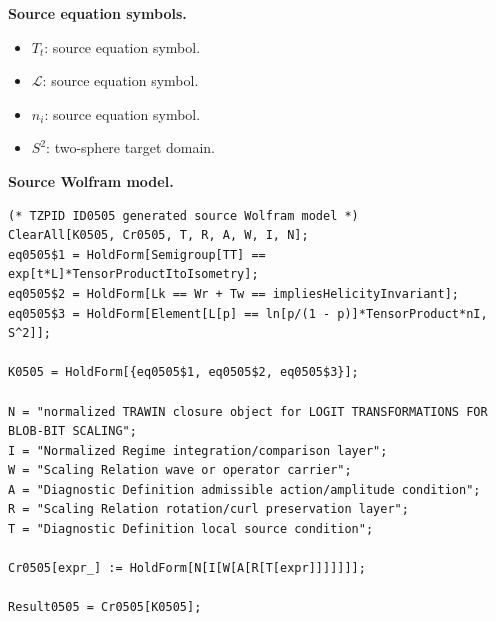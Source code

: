 \begin{minipage}[t]{0.49\linewidth}
\begingroup
\small
\raggedright
\textbf{Source equation symbols.}\par
\begin{itemize}[leftmargin=1.35em,itemsep=1pt,topsep=1pt,parsep=0pt]
    \item $T_t$: source equation symbol.
    \item $\mathcal{L}$: source equation symbol.
    \item $n_i$: source equation symbol.
    \item $S^2$: two-sphere target domain.
\end{itemize}
\endgroup
\end{minipage}\hfill
\begin{minipage}[t]{0.47\linewidth}
\begingroup
\scriptsize
\raggedright
\textbf{Source Wolfram model.}\par
\begin{Verbatim}[fontsize=\tiny,breaklines=true,breakanywhere=true]
(* TZPID ID0505 generated source Wolfram model *)
ClearAll[K0505, Cr0505, T, R, A, W, I, N];
eq0505$1 = HoldForm[Semigroup[TT] == exp[t*L]*TensorProductItoIsometry];
eq0505$2 = HoldForm[Lk == Wr + Tw == impliesHelicityInvariant];
eq0505$3 = HoldForm[Element[L[p] == ln[p/(1 - p)]*TensorProduct*nI, S^2]];

K0505 = HoldForm[{eq0505$1, eq0505$2, eq0505$3}];

N = "normalized TRAWIN closure object for LOGIT TRANSFORMATIONS FOR BLOB-BIT SCALING";
I = "Normalized Regime integration/comparison layer";
W = "Scaling Relation wave or operator carrier";
A = "Diagnostic Definition admissible action/amplitude condition";
R = "Scaling Relation rotation/curl preservation layer";
T = "Diagnostic Definition local source condition";

Cr0505[expr_] := HoldForm[N[I[W[A[R[T[expr]]]]]]];

Result0505 = Cr0505[K0505];
\end{Verbatim}
\endgroup
\end{minipage}

